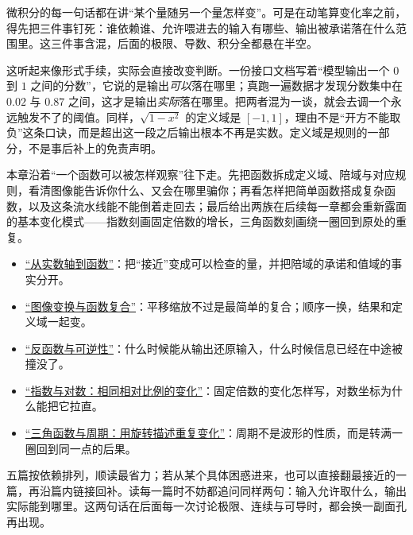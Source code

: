 微积分的每一句话都在讲``某个量随另一个量怎样变''。可是在动笔算变化率之前，得先把三件事钉死：谁依赖谁、允许喂进去的输入有哪些、输出被承诺落在什么范围里。这三件事含混，后面的极限、导数、积分全都悬在半空。

这听起来像形式手续，实际会直接改变判断。一份接口文档写着``模型输出一个 \(0\) 到 \(1\) 之间的分数''，它说的是输出\emph{可以}落在哪里；真跑一遍数据才发现分数集中在 \(0.02\) 与 \(0.87\) 之间，这才是输出\emph{实际}落在哪里。把两者混为一谈，就会去调一个永远触发不了的阈值。同样，\(\sqrt{1-x^2}\) 的定义域是 \([-1,1]\)，理由不是``开方不能取负''这条口诀，而是超出这一段之后输出根本不再是实数。定义域是规则的一部分，不是事后补上的免责声明。

本章沿着``一个函数可以被怎样观察''往下走。先把函数拆成定义域、陪域与对应规则，看清图像能告诉你什么、又会在哪里骗你；再看怎样把简单函数搭成复杂函数，以及这条流水线能不能倒着走回去；最后给出两族在后续每一章都会重新露面的基本变化模式——指数刻画固定倍数的增长，三角函数刻画绕一圈回到原处的重复。

\begin{itemize}
\tightlist
\item
  \hyperref[sec:02-Calculus/01-Functions-and-Precalculus/01]{``从实数轴到函数''}：把``接近''变成可以检查的量，并把陪域的承诺和值域的事实分开。
\item
  \hyperref[sec:02-Calculus/01-Functions-and-Precalculus/02]{``图像变换与函数复合''}：平移缩放不过是最简单的复合；顺序一换，结果和定义域一起变。
\item
  \hyperref[sec:02-Calculus/01-Functions-and-Precalculus/03]{``反函数与可逆性''}：什么时候能从输出还原输入，什么时候信息已经在中途被撞没了。
\item
  \hyperref[sec:02-Calculus/01-Functions-and-Precalculus/04]{``指数与对数：相同相对比例的变化''}：固定倍数的变化怎样写，对数坐标为什么能把它拉直。
\item
  \hyperref[sec:02-Calculus/01-Functions-and-Precalculus/05]{``三角函数与周期：用旋转描述重复变化''}：周期不是波形的性质，而是转满一圈回到同一点的后果。
\end{itemize}

五篇按依赖排列，顺读最省力；若从某个具体困惑进来，也可以直接翻最接近的一篇，再沿篇内链接回补。读每一篇时不妨都追问同样两句：输入允许取什么，输出实际能到哪里。这两句话在后面每一次讨论极限、连续与可导时，都会换一副面孔再出现。
